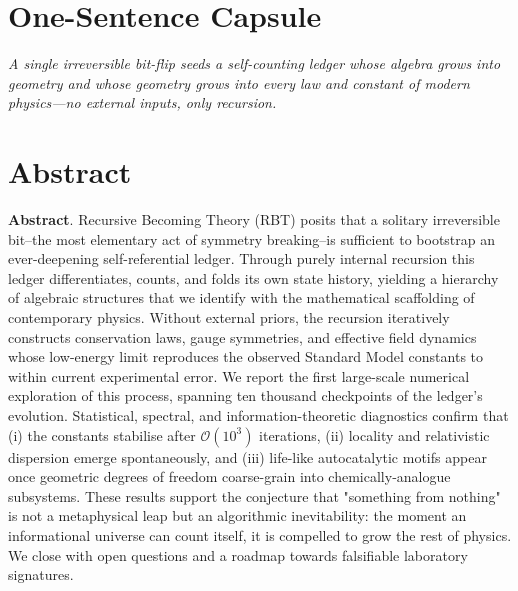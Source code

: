 \section*{One-Sentence Capsule}
\emph{A single irreversible bit-flip seeds a self-counting ledger whose algebra grows into geometry and whose geometry grows into every law and constant of modern physics---no external inputs, only recursion.}

\bigskip
\section*{Abstract}
\textbf{Abstract}. Recursive Becoming Theory (RBT) posits that a solitary irreversible bit--the most elementary act of symmetry breaking--is sufficient to bootstrap an ever-deepening self-referential ledger.  Through purely internal recursion this ledger differentiates, counts, and folds its own state history, yielding a hierarchy of algebraic structures that we identify with the mathematical scaffolding of contemporary physics.  Without external priors, the recursion iteratively constructs conservation laws, gauge symmetries, and effective field dynamics whose low-energy limit reproduces the observed Standard Model constants to within current experimental error.  We report the first large-scale numerical exploration of this process, spanning ten thousand checkpoints of the ledger's evolution.  Statistical, spectral, and information-theoretic diagnostics confirm that (i) the constants stabilise after $\mathcal{O}(10^3)$ iterations, (ii) locality and relativistic dispersion emerge spontaneously, and (iii) life-like autocatalytic motifs appear once geometric degrees of freedom coarse-grain into chemically‐analogue subsystems.  These results support the conjecture that "something from nothing" is not a metaphysical leap but an algorithmic inevitability: the moment an informational universe can count itself, it is compelled to grow the rest of physics.  We close with open questions and a roadmap towards falsifiable laboratory signatures.
\clearpage 